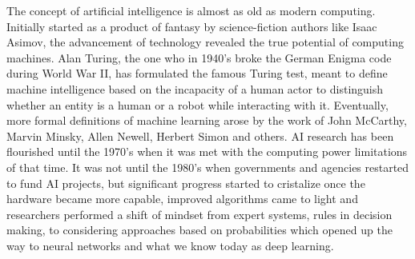 \par The concept of artificial intelligence is almost as old as modern computing. Initially started as a product of fantasy by science-fiction authors like Isaac Asimov, the advancement of technology revealed the true potential of computing machines. Alan Turing, the one who in 1940's broke the German Enigma code during World War II, has formulated the famous Turing test, meant to define machine intelligence based on the incapacity of a human actor to distinguish whether an entity is a human or a robot while interacting with it. Eventually, more formal definitions of machine learning arose by the work of John McCarthy, Marvin Minsky, Allen Newell, Herbert Simon and others. AI research has been flourished until the 1970's when it was met with the computing power limitations of that time. It was not until the 1980's when governments and agencies restarted to fund AI projects, but significant progress started to cristalize once the hardware became more capable, improved algorithms came to light and 
researchers performed a shift of mindset from expert systems, rules in decision making, to considering approaches based on probabilities which opened up the way to neural networks and what we know today as deep learning. \cite{BriefHistoryOfAI}